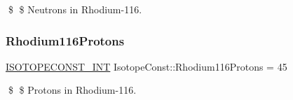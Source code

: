 \$ \$ Neutrons in Rhodium-\/116. \mbox{\label{group___isotope_const-_rhodium-_rh116_gae0e5f274eb43652999f054fe4b2dc129}} 
\subsubsection{\texorpdfstring{Rhodium116\+Protons}{Rhodium116Protons}}
{\footnotesize\ttfamily \mbox{\hyperlink{group___isotope_const-_macros_ga5f18360b3e99483a35c32d789e62621c}{I\+S\+O\+T\+O\+P\+E\+C\+O\+N\+S\+T\+\_\+\+I\+NT}} Isotope\+Const\+::\+Rhodium116\+Protons = 45}

\$ \$ Protons in Rhodium-\/116. 